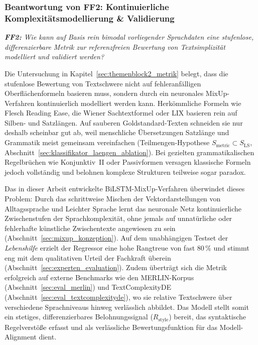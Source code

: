 \subsubsection{Beantwortung von FF2: Kontinuierliche Komplexitätsmodellierung \& Validierung}

\begin{tcolorbox}[boxrule=0pt,sharp corners,enhanced,borderline west={2pt}{0pt}{blue}]
    \textit{\textbf{FF2:} Wie kann auf Basis rein bimodal vorliegender Sprachdaten eine stufenlose, differenzierbare Metrik zur referenzfreien Bewertung von Textsimplizität modelliert und validiert werden?}
\end{tcolorbox}

Die Untersuchung in Kapitel~\ref{sec:themenblock2_metrik} belegt, dass die stufenlose Bewertung von Textschwere nicht auf fehleranfälligen Oberflächenformeln basieren muss, sondern durch ein neuronales MixUp-Verfahren kontinuierlich modelliert werden kann. Herkömmliche Formeln wie Flesch Reading Ease, die Wiener Sachtextformel oder LIX basieren rein auf Silben- und Satzlängen. Auf sauberen Goldstandard-Texten schneiden sie nur deshalb scheinbar gut ab, weil menschliche Übersetzungen Satzlänge und Grammatik meist gemeinsam vereinfachen (Teilmengen-Hypothese $S_{\text{metric}} \subset S_{\text{LS}}$, Abschnitt~\ref{sec:klassifikator_laengen_ablation}). Bei gezielten grammatikalischen Regelbrüchen wie Konjunktiv~II oder Passivformen versagen klassische Formeln jedoch vollständig und belohnen komplexe Strukturen teilweise sogar paradox.

Das in dieser Arbeit entwickelte BiLSTM-MixUp-Verfahren überwindet dieses Problem: Durch das schrittweise Mischen der Vektordarstellungen von Alltagssprache und Leichter Sprache lernt das neuronale Netz kontinuierliche Zwischenstufen der Sprachkomplexität, ohne jemals auf unnatürliche oder fehlerhafte künstliche Zwischentexte angewiesen zu sein (Abschnitt~\ref{sec:mixup_konzeption}). Auf dem unabhängigen Testset der \textit{Lebenshilfe} erzielt der Regressor eine hohe Rangtreue von fast $80\,\%$ und stimmt eng mit dem qualitativen Urteil der Fachkraft überein (Abschnitt~\ref{sec:experten_evaluation}). Zudem überträgt sich die Metrik erfolgreich auf externe Benchmarks wie den MERLIN-Korpus (Abschnitt~\ref{sec:eval_merlin}) und TextComplexityDE (Abschnitt~\ref{sec:eval_textcomplexityde}), wo sie relative Textschwere über verschiedene Sprachniveaus hinweg verlässlich abbildet. Das Modell stellt somit ein stetiges, differenzierbares Belohnungssignal ($R_{\text{style}}$) bereit, das syntaktische Regelverstöße erfasst und als verlässliche Bewertungsfunktion für das Modell-Alignment dient.

